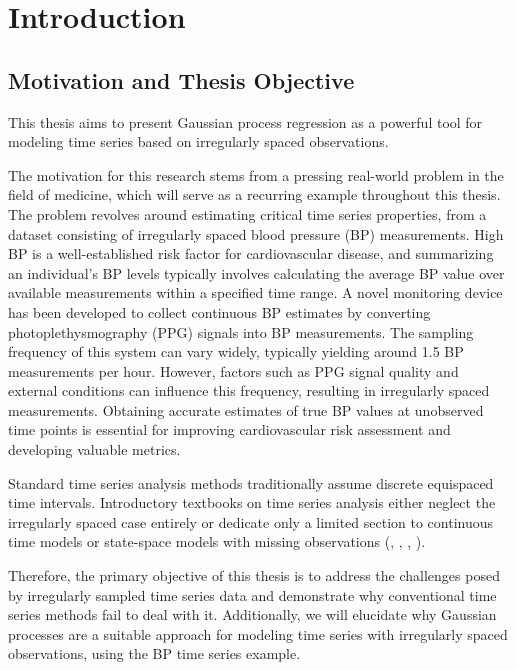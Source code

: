\chapter{Introduction}\label{ch:introduction}

\section{Motivation and Thesis Objective}\label{sec:thesis-objective}

This thesis aims to present Gaussian process regression as a powerful tool for
modeling time series based on irregularly spaced observations.

The motivation for this research stems from a pressing real-world problem in the
field of medicine, which will serve as a recurring example throughout this thesis. 
The problem revolves around estimating critical time series properties,
from a dataset consisting of irregularly spaced blood pressure (BP) measurements.
High BP is a well-established risk factor for cardiovascular disease, and
summarizing an individual's BP levels typically involves calculating the average
BP value over available measurements within a specified time range. A novel
monitoring device has been developed to collect continuous BP estimates by
converting photoplethysmography (PPG) signals into BP measurements. 
The sampling frequency of this system can vary widely, typically yielding around
1.5 BP measurements per hour. 
However, factors such as PPG signal quality and external conditions can 
influence this frequency, resulting in irregularly spaced
measurements.
Obtaining accurate estimates of true BP values at unobserved time points is
essential for improving cardiovascular risk assessment and developing valuable
metrics.

Standard time series analysis methods traditionally assume discrete equispaced
time intervals. Introductory textbooks on time series analysis either neglect
the irregularly spaced case entirely or dedicate only a limited section to
continuous time models or state-space models with missing observations (\citeauthor{brockwell_time_1991}, \citeauthor{brockwell_introduction_2016},
\citeauthor{cryer_time_2008}, \citeauthor{chatfield_analysis_2003}).

Therefore, the primary objective of this thesis is to address the challenges
posed by irregularly sampled time series data and demonstrate why conventional
time series methods fail to deal with it. Additionally, we will elucidate why Gaussian
processes are a suitable approach for modeling time series with irregularly
spaced observations, using the BP time series example.

